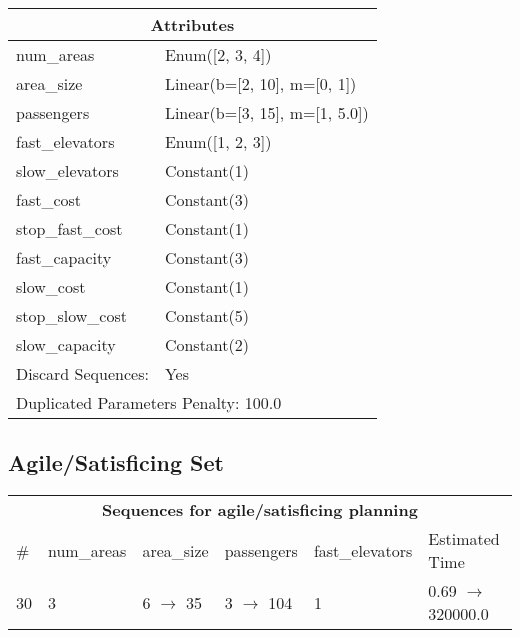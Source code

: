 \documentclass{article}
\begin{document}
                    \begin{center}
                    \begin{tabular}{p{}p{}}
                    \multicolumn{2}{c}{\bf \large Attributes}\\\midrule
                    num\_areas & Enum([2, 3, 4])\\
area\_size & Linear(b=[2, 10], m=[0, 1])\\
passengers & Linear(b=[3, 15], m=[1, 5.0])\\
fast\_elevators & Enum([1, 2, 3])\\
slow\_elevators & Constant(1)\\
fast\_cost & Constant(3)\\
stop\_fast\_cost & Constant(1)\\
fast\_capacity & Constant(3)\\
slow\_cost & Constant(1)\\
stop\_slow\_cost & Constant(5)\\
slow\_capacity & Constant(2)
                    
                    
                                \\\midrule
                                Discard Sequences: & Yes
                             \\\midrule
                    \multicolumn{2}{l}{Duplicated Parameters Penalty: 100.0}
                    \end{tabular}
                    \end{center}
                
                         \subsection*{Agile/Satisficing Set}

                        \begin{center}
                        \begin{tabular}{l|l|l|l|l|l}
                        \multicolumn{6}{c}{\bf \large Sequences for agile/satisficing planning}\\
                        \# & num\_areas & area\_size & passengers & fast\_elevators & Estimated Time\\\midrule
                        30&3&6 $\rightarrow$ 35&3 $\rightarrow$ 104&1&0.69 $\rightarrow$ 320000.0
                        \end{tabular}
                        \end{center}
                    
\end{document}
